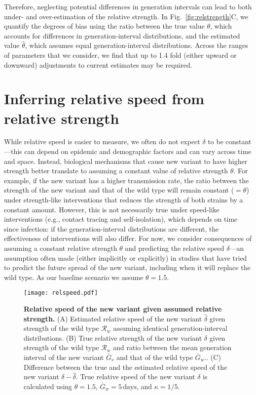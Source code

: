 \documentclass[12pt]{article}
\newcommand{\fref}[1]{Fig.~\ref{fig:#1}}
\newcommand{\RR}{\ensuremath{{\mathcal R}}\xspace}
\begin{document}
Therefore, neglecting potential differences in generation intervals can lead to both under- and over-estimation of the relative strength.
In \fref{relstrength}C, we quantify the degrees of bias using the ratio between the true value $\theta$, which accounts for differences in generation-interval distributions, and the estimated value $\hat{\theta}$, which assumes equal generation-interval distributions.
Across the ranges of parameters that we consider, we find that up to 1.4 fold (either upward or downward) adjustments to current estimates may be required.

\section{Inferring relative speed from relative strength}

While relative speed is easier to measure, we often do not expect $\delta$ to be constant---this can depend on epidemic and demographic factors and can vary across time and space.
Instead, biological mechanisms that cause new variant to have higher strength better translate to assuming a constant value of relative strength $\theta$.
For example, if the new variant has a higher transmission rate, the ratio between the strength of the new variant and that of the wild type will remain constant ($=\theta$) under strength-like interventions that reduces the strength of both strains by a constant amount.
However, this is not necessarily true under speed-like interventions (e.g., contact tracing and self-isolation), which depends on time since infection: if the generation-interval distributions are different, the effectiveness of interventions will also differ.
For now, we consider consequences of assuming a constant relative strength $\theta$ and predicting the relative speed $\delta$---an assumption often made (either implicitly or explicitly) in studies that have tried to predict the future spread of the new variant, including when it will replace the wild type.
As our baseline scenario we assume $\theta = 1.5$.

\begin{figure}[!th]
\texttt{[image: relspeed.pdf]}
\caption{
\textbf{Relative speed of the new variant given assumed relative strength.}
(A) Estimated relative speed of the new variant $\hat{\delta}$ given strength of the wild type $\RR_w$ assuming identical generation-interval distributions.
(B) True relative strength of the new variant $\delta$ given strength of the wild type $\RR_w$ and ratio between the mean generation interval of the new variant $\bar{G}_v$ and that of the wild type $\bar{G}_w$..
(C) Difference between the true and the estimated relative speed of the new variant $\delta - \hat{\delta}$.
True relative speed of the new variant $\delta$ is calculated using $\theta=1.5$, $\bar{G}_w = 5\,\textrm{days}$, and $\kappa=1/5$.
}
\label{fig:relspeed}
\end{figure}
\end{document}
